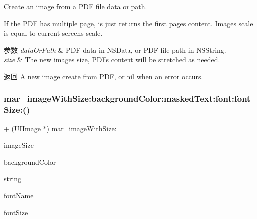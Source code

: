 Create an image from a P\+DF file data or path.

If the P\+DF has multiple page, is just return\textquotesingle{}s the first page\textquotesingle{}s content. Image\textquotesingle{}s scale is equal to current screen\textquotesingle{}s scale.


\begin{DoxyParams}{参数}
{\em data\+Or\+Path} & P\+DF data in {\ttfamily N\+S\+Data}, or P\+DF file path in {\ttfamily N\+S\+String}.\\
\hline
{\em size} & The new image\textquotesingle{}s size, P\+DF\textquotesingle{}s content will be stretched as needed.\\
\hline
\end{DoxyParams}
\begin{DoxyReturn}{返回}
A new image create from P\+DF, or nil when an error occurs. 
\end{DoxyReturn}
\mbox{\label{category_u_i_image_07_m_a_r_e_x_08_a47bb40f3c82b65f3cb6301cdff272f7d}} 
\subsubsection{\texorpdfstring{mar\+\_\+image\+With\+Size\+:background\+Color\+:masked\+Text\+:font\+:font\+Size\+:()}{mar\_imageWithSize:backgroundColor:maskedText:font:fontSize:()}}
{\footnotesize\ttfamily + (U\+I\+Image $\ast$) mar\+\_\+image\+With\+Size\+: \begin{DoxyParamCaption}\item[{(C\+G\+Size)}]{image\+Size }\item[{backgroundColor:(U\+I\+Color $\ast$)}]{background\+Color }\item[{maskedText:(N\+S\+String $\ast$)}]{string }\item[{font:(M\+A\+R\+Font\+Name)}]{font\+Name }\item[{fontSize:(C\+G\+Float)}]{font\+Size }\end{DoxyParamCaption}}

